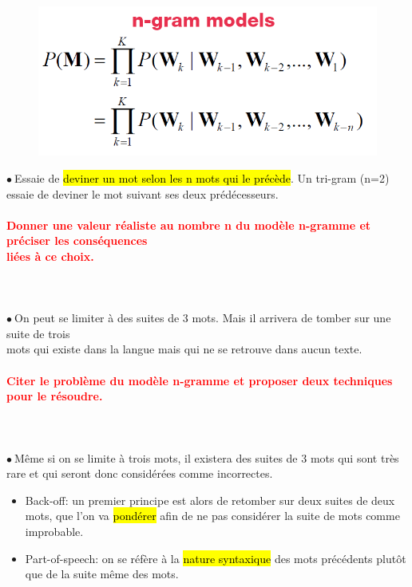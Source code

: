 \documentclass[letterpaper, 12pt]{article}
\newcommand{\alinea}{
\hspace*{0.3cm}}
\newcommand{\red}[1]{
	\textcolor{red}{#1}
}
\newcommand{\point}{$\bullet\ $}
\begin{document}
		\begin{minipage}{0.5\textwidth}
			\begin{figure}[H]
				\includegraphics[scale=0.35]{Images/language_model3}
			\end{figure}\noindent
		\end{minipage}\hfill
		\begin{minipage}{0.45\textwidth}
			\point Essaie de \hl{deviner un mot selon les n mots qui le pr\'ec\`ede}. 
				Un tri-gram (n=2) essaie de deviner le mot suivant ses deux prédécesseurs.
		\end{minipage}
		
		\paragraph{\red{Donner une valeur réaliste au nombre n du modèle n-gramme et préciser les conséquences 
		~\\ \hspace*{0.035cm} liées à ce choix.}}~\\~\\
			\point On peut se limiter à des suites de 3 mots. Mais il arrivera de tomber sur une suite de trois
				\\\alinea mots qui existe dans la langue mais qui ne se retrouve dans aucun texte.
		\paragraph{\red{Citer le problème du modèle n-gramme et proposer deux techniques pour le résoudre.}}~\\~\\
			\point Même si on se limite à trois mots, il existera des suites de 3 mots qui sont très rare et qui
				seront donc considérées comme incorrectes.
			\begin{itemize}
				\setlength{\itemsep}{0pt}		
				\setlength{\parskip}{0pt}		
				\setlength{\parsep}{0pt}	
				\item Back-off: un premier principe est alors de retomber sur deux suites de deux mots, que l'on va 
					\hl{pond\'erer} afin de ne pas considérer la suite de mots comme improbable.
				\item Part-of-speech: on se réfère à la \hl{nature syntaxique} des mots précédents plutôt que de la
					suite même des mots.
			\end{itemize}
\end{document}
